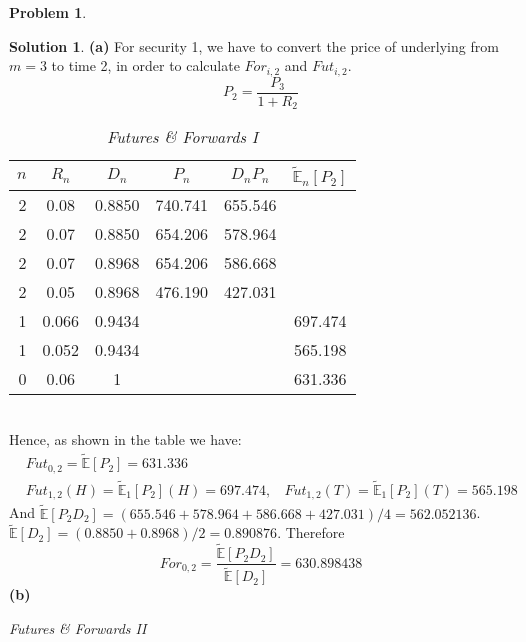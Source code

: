 \documentclass[a4paper, 10pt]{article}
\renewcommand{\arraystretch}{1.4}
\theoremstyle{definition}
\newtheorem{problem}{Problem}
\theoremstyle{hSol}
\newtheorem*{solution}{Solution}
\begin{document}
\begin{problem} 
\end{problem}
\begin{solution} \textbf{(a)} For security 1, we have to convert the price of underlying from $m=3$ to time 2, in order to calculate $For_{i, 2}$ and $Fut_{i,2}$.
$$
P_2 = \frac{P_3}{1+R_2}
$$

\begin{table}[h]
\vspace{-1pt}
\caption{\textit{Futures \& Forwards I}}
\vspace{-7pt}
\centering
\def\arraystretch{1.15}
\begin{tabular}{|r|ccccc|}
\hline
$n$ & $R_n$ & $D_{n}$ & $P_n$ & $D_{n}P_n$ & $\tilde{\mathbb{E}}_{n}\left[P_2\right]$\\ 
\hline
2 & 0.08 & 0.8850 & 740.741 & 655.546&\\
2 & 0.07 & 0.8850 & 654.206 & 578.964&\\
2 & 0.07 & 0.8968 & 654.206 & 586.668&\\
2 & 0.05 & 0.8968 & 476.190 & 427.031&\\
\hline
1 & 0.066 & 0.9434 & && 697.474 \\
1 & 0.052 & 0.9434 & &&565.198 \\
\hline
0 & 0.06 & 1 & &&631.336 \\
\hline
\end{tabular}
\label{tab:ff1}
\end{table}
~\\
Hence, as shown in the table we have:
\begin{equation}
  \begin{split}
    &Fut_{0,2} = \tilde{\mathbb{E}}\left[P_2\right] = 631.336\\
    &Fut_{1,2}(H) = \tilde{\mathbb{E}}_1\left[P_2\right](H) = 697.474,~~~~Fut_{1,2}(T) = \tilde{\mathbb{E}}_1\left[P_2\right](T) = 565.198
  \end{split}
\end{equation}
And $\tilde{\mathbb{E}}\left[P_2D_2\right] = (655.546+578.964+586.668+427.031)/4 = 562.052136$. $\tilde{\mathbb{E}}\left[D_2\right] = (0.8850+0.8968)/2 = 0.890876$. Therefore
$$
For_{0,2} = \frac{\tilde{\mathbb{E}}\left[P_2D_2\right]}{\tilde{\mathbb{E}}\left[D_2\right]} = 630.898438
$$
\textbf{(b)}
\begin{table}[h]
\vspace{-1pt}
\caption{\textit{Futures \& Forwards II}}
\vspace{-7pt}
\centering
\def\arraystretch{1.15}

\end{table}
\end{solution}
\end{document}
